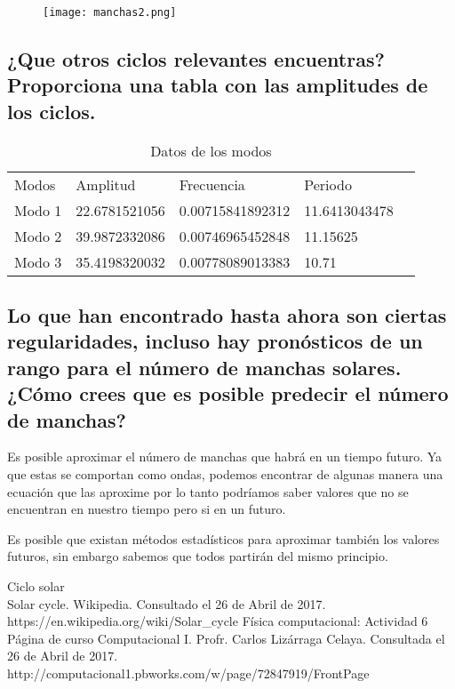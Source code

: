 \begin{figure}[ht!]
\centering
\texttt{[image: manchas2.png]}
\end{figure}

\subsection*{¿Que otros ciclos relevantes encuentras? Proporciona una tabla con las amplitudes de los ciclos. }

\begin{table}[ht!]
\centering
\caption{Datos de los modos}
\begin{tabular}{|l|l|l|l|l}
\cline{1-4}
Modos  & Amplitud      & Frecuencia       & Periodo       &  \\ \cline{1-4}
Modo 1 & 22.6781521056 & 0.00715841892312 & 11.6413043478 &  \\ \cline{1-4}
Modo 2 & 39.9872332086 & 0.00746965452848 & 11.15625      &  \\ \cline{1-4}
Modo 3 & 35.4198320032 & 0.00778089013383 & 10.71         &  \\ \cline{1-4}
\end{tabular}
\end{table}
\newpage
\subsection*{Lo que han encontrado hasta ahora son ciertas regularidades, incluso hay pronósticos de un rango para el número de manchas solares. ¿Cómo crees que es posible predecir el número de manchas?}
\noindent Es posible aproximar el número de manchas que habrá en un tiempo futuro. Ya que estas se comportan como ondas, podemos encontrar de algunas manera una ecuación que las aproxime por lo tanto podríamos saber valores que no se encuentran en nuestro tiempo pero si en un futuro.

Es posible que existan métodos estadísticos para aproximar también los valores futuros, sin embargo sabemos que todos partirán del mismo principio. 

\begin{thebibliography}{9}
Ciclo solar \\

Solar cycle. Wikipedia. Consultado el 26 de Abril de 2017. https://en.wikipedia.org/wiki/Solar\_cycle 
Física computacional: Actividad 6 \\

Página de curso Computacional I. Profr. Carlos Lizárraga Celaya. Consultada el 26 de Abril de 2017. http://computacional1.pbworks.com/w/page/72847919/FrontPage

\end{thebibliography}


